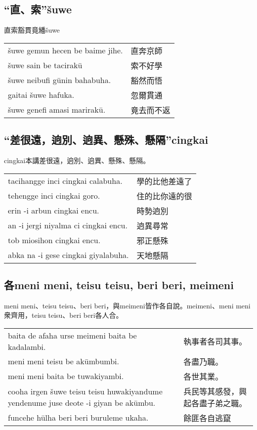 \documentclass{article}
\begin{document}
\subsection{“直、索”\v{s}uwe}
\noindent 直索豁貫竟繙\v{s}uwe
\begin{center}
    \begin{tabularx}{\textwidth}{XX}
        \v{s}uwe gemun hecen be baime jihe. & 直奔京師\\
        \v{s}uwe sain be tacirak\={u} & 索不好學\\
        \v{s}uwe neibufi g\={u}nin bahabuha. & 豁然而悟\\
        gaitai \v{s}uwe hafuka. & 忽爾貫通\\
        \v{s}uwe genefi amasi marirak\={u}. & 竟去而不返
    \end{tabularx}
\end{center}

\subsection{“差很遠，逈別、逈異、懸殊、懸隔”cingkai}
\noindent cingkai本講差很遠，逈別、逈異、懸殊、懸隔。
\begin{center}
    \begin{tabularx}{\textwidth}{XX}
        tacihangge inci cingkai calabuha. & 學的比他差遠了\\
        tehengge inci cingkai goro. & 住的比你遠的很\\
        erin -i arbun cingkai encu. & 時勢逈別\\
        an -i jergi niyalma ci cingkai encu. & 逈異尋常\\
        tob miosihon cingkai encu. & 邪正懸殊\\
        abka na -i gese cingkai giyalabuha. & 天地懸隔
    \end{tabularx}
\end{center}

\subsection{各meni meni, teisu teisu, beri beri, meimeni}
\noindent meni meni、teisu teisu、beri beri，與meimeni皆作各自說。meimeni、meni meni衆齊用，teisu teisu、beri beri各人合。
\begin{center}
    \begin{tabularx}{\textwidth}{XX}
        baita de afaha urse meimeni baita be kadalambi. & 執事者各司其事。\\
        meni meni teisu be ak\={u}mbumbi. & 各盡乃職。\\
        meni meni baita be tuwakiyambi. & 各世其業。\\
        cooha irgen \v{s}uwe teisu teisu huwakiyandume yendenume juse deote -i giyan be ak\={u}mbu. & 兵民等其感發，興起各盡子弟之職。\\
        funcehe h\={u}lha beri beri buruleme ukaha. & 餘匪各自逃竄
    \end{tabularx}
\end{center}
\end{document}

